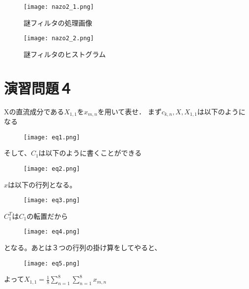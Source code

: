 \documentclass[a4j]{jsarticle}
\begin{document}
\begin{figure}[H]
  \centering
  \texttt{[image: nazo2\_1.png]}
  \caption{謎フィルタの処理画像}
  \label{pic:nazo2_1}
\end{figure}
\begin{figure}[H]
  \centering
  \texttt{[image: nazo2\_2.png]}
  \caption{謎フィルタのヒストグラム}
  \label{pic:nazo2_2}
\end{figure}

\section{演習問題４}
Xの直流成分である$X_{1,1}$を$x_{m,n}$を用いて表せ．
まず$c_{k,n},X,X_{1,1}$は以下のようになる
\begin{figure}[H]
  \centering
  \texttt{[image: eq1.png]}
\end{figure}
そして、$C_1$は以下のように書くことができる
\begin{figure}[H]
  \centering
  \texttt{[image: eq2.png]}
\end{figure}
$x$は以下の行列となる。
\begin{figure}[H]
  \centering
  \texttt{[image: eq3.png]}
\end{figure}
$C_1^T$は$C_1$の転置だから
\begin{figure}[H]
  \centering
  \texttt{[image: eq4.png]}
\end{figure}
となる。あとは３つの行列の掛け算をしてやると、
\begin{figure}[H]
  \centering
  \texttt{[image: eq5.png]}
\end{figure}
よって$X_{1,1} = \frac{1}{8}\sum_{n=1}^8\sum_{n=1}^8{x_{m,n}}$
\end{document}
